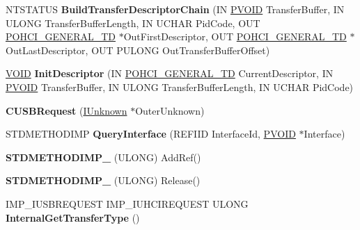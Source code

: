 \begin{DoxyCompactItemize}
\mbox{\label{class_c_u_s_b_request_aa445aa3d333e193583cffa40ec051f86}} 
N\+T\+S\+T\+A\+T\+US {\bfseries Build\+Transfer\+Descriptor\+Chain} (IN \hyperlink{interfacevoid}{P\+V\+O\+ID} Transfer\+Buffer, IN U\+L\+O\+NG Transfer\+Buffer\+Length, IN U\+C\+H\+AR Pid\+Code, O\+UT \hyperlink{struct_o_h_c_i___g_e_n_e_r_a_l___t_d}{P\+O\+H\+C\+I\+\_\+\+G\+E\+N\+E\+R\+A\+L\+\_\+\+TD} $\ast$Out\+First\+Descriptor, O\+UT \hyperlink{struct_o_h_c_i___g_e_n_e_r_a_l___t_d}{P\+O\+H\+C\+I\+\_\+\+G\+E\+N\+E\+R\+A\+L\+\_\+\+TD} $\ast$Out\+Last\+Descriptor, O\+UT P\+U\+L\+O\+NG Out\+Transfer\+Buffer\+Offset)
\item 
\mbox{\label{class_c_u_s_b_request_a8c4448f8040a5bc5e0a800755189634b}} 
\hyperlink{interfacevoid}{V\+O\+ID} {\bfseries Init\+Descriptor} (IN \hyperlink{struct_o_h_c_i___g_e_n_e_r_a_l___t_d}{P\+O\+H\+C\+I\+\_\+\+G\+E\+N\+E\+R\+A\+L\+\_\+\+TD} Current\+Descriptor, IN \hyperlink{interfacevoid}{P\+V\+O\+ID} Transfer\+Buffer, IN U\+L\+O\+NG Transfer\+Buffer\+Length, IN U\+C\+H\+AR Pid\+Code)
\item 
\mbox{\label{class_c_u_s_b_request_a059d235428707fc6b43d4402b6f6fe52}} 
{\bfseries C\+U\+S\+B\+Request} (\hyperlink{interface_i_unknown}{I\+Unknown} $\ast$Outer\+Unknown)
\item 
\mbox{\label{class_c_u_s_b_request_a3d7d6989e63d96bf70a78666e643eb15}} 
S\+T\+D\+M\+E\+T\+H\+O\+D\+I\+MP {\bfseries Query\+Interface} (R\+E\+F\+I\+ID Interface\+Id, \hyperlink{interfacevoid}{P\+V\+O\+ID} $\ast$Interface)
\item 
\mbox{\label{class_c_u_s_b_request_ac0b1c70c2b98ff19e9a94b94b7fb460c}} 
{\bfseries S\+T\+D\+M\+E\+T\+H\+O\+D\+I\+M\+P\+\_\+} (U\+L\+O\+NG) Add\+Ref()
\item 
\mbox{\label{class_c_u_s_b_request_afed0e2345a488509c5260d555c2da79c}} 
{\bfseries S\+T\+D\+M\+E\+T\+H\+O\+D\+I\+M\+P\+\_\+} (U\+L\+O\+NG) Release()
\item 
\mbox{\label{class_c_u_s_b_request_a02a63b378a80c0912edd038208c7971b}} 
I\+M\+P\+\_\+\+I\+U\+S\+B\+R\+E\+Q\+U\+E\+ST I\+M\+P\+\_\+\+I\+U\+H\+C\+I\+R\+E\+Q\+U\+E\+ST U\+L\+O\+NG {\bfseries Internal\+Get\+Transfer\+Type} ()

\end{DoxyCompactItemize}
